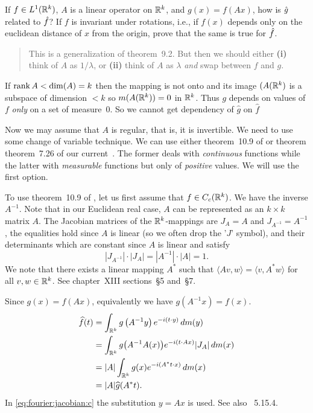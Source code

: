 \begin{enumerate}
\begin{excopy}
If \(f\in L^1(\mathbb{R}^k)\), $A$ is a linear operator on \(\mathbb{R}^k\), 
and \(g(x) = f(Ax)\),
how is \(\Hat{g}\) related to \(\Hat{f}\)?
If $f$ is invariant under rotations, i.e., if \(f(x)\) depends only 
on the euclidean distance of $x$ from the origin, prove that the same 
is true for \(\Hat{f}\).
\end{excopy}

\begin{quote}
This is a generalization of theorem~9.2.
But then we should  either
\textbf{(i)} think of $A$ as \(1/\lambda\),
or 
\textbf{(ii)} 
think of $A$ as \(\lambda\) \emph{and} swap between $f$ and $g$.
\end{quote}

If \(\mathop{\rm rank}\nolimits{A} < \dim(A) = k\) then the mapping is not onto 
and its image \((A(\mathbb{R}^k)\) is a subspace of dimension \(<k\)
so \(m(A(\mathbb{R}^k)) = 0\) in \(\mathbb{R}^k\).
Thus $g$ depends on values of $f$ \emph{only} on a set of measure~$0$.
So we cannot get dependency of \(\widehat{g}\) on \(\widehat{f}\)

Now we may assume that $A$ is regular, that is, it is invertible.
We need to use some change of variable technique.
We can use either theorem~10.9 of \cite{RudinPMA85}
or theorem theorem~7.26 of our current~\cite{RudinRCA87}.
The former deals with \emph{continuous} functions
while the latter with \emph{measurable} functions but only 
of \emph{positive} values. We will use the first option.

To use theorem~10.9 of \cite{RudinPMA85}, 
let us first assume that \(f\in C_c(\mathbb{R}^k)\).
We have the inverse \(A^{-1}\).
Note that in our Euclidean real case, $A$ can be represented 
as an \(k\times k\) matrix $A$.
The Jacobian matrices  of the \(\mathbb{R}^k\)-mappings are
\(J_A=A\) and \(J_{A^{-1}}=A^{-1}\), the equalities hold
since $A$ is linear (so we often drop the '$J$' symbol), 
and their determinants 
which are constant since $A$ is linear and satisfy
\begin{equation*}
\left|J_{A^{-1}}\right|\cdot\left|J_A\right| = |A^{-1}|\cdot |A| = 1.
\end{equation*}
We note that there exists a linear mapping \(A^*\)
such that 
\(\langle Av,w\rangle =  \langle v, A^*w\rangle\)
for all \(v,w\in\mathbb{R}^k\).
See \cite{Lang94} chapter~\textsf{XIII} sections~\S5 and~\S7.

Since \(g(x) = f(Ax)\), equivalently we have \(g(A^{-1}x) = f(x)\).
\begin{align}
\widehat{f}(t) 
&= \int_{\mathbb{R}^k} g\left(A^{-1}y\right)e^{-i(t\cdot y)}\,dm(y) \notag \\
&= \int_{\mathbb{R}^k} g\bigl(A^{-1}A(x)\bigr)e^{-i(t\cdot Ax)} |J_A|\,dm(x) 
   \label{eq:fourier:jacobian:c} \\
&= |A|\int_{\mathbb{R}^k} g(x)e^{-i(A^*t\cdot x)} \,dm(x) 
   \label{eq:fourier:innerprod} \\
&= |A|\widehat{g}(A^*t).
\end{align}
In \eqref{eq:fourier:jacobian:c} the substitution \(y=Ax\) is used.
See also \cite{EdwFA}~5.15.4.


\end{enumerate}

